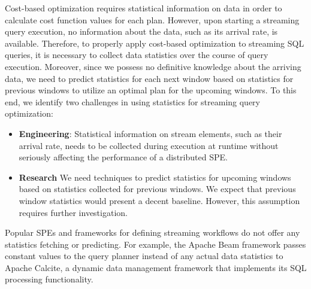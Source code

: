 Cost-based optimization requires statistical information on data in order to calculate cost function values for each plan. However, upon starting a streaming query execution, no information about the data, such as its arrival rate, is available. 
Therefore, to properly apply cost-based optimization to streaming SQL queries, it is necessary to collect data statistics over the course of query execution. 
Moreover, since we possess no definitive knowledge about the arriving data, we need to predict statistics for each next window based on statistics for previous windows to utilize an optimal plan for the upcoming windows. To this end, we identify two challenges in using statistics for streaming query optimization:

\begin{itemize}
    \item \textbf{Engineering}:
    Statistical information on stream elements, such as their arrival rate, needs to be collected during execution at runtime without seriously affecting the performance of a distributed SPE. %
    \item \textbf{Research}
We need techniques to predict statistics for upcoming windows based on statistics collected for previous windows.    
We expect that previous window statistics would present a decent baseline. 
However, this assumption requires further investigation. 
\end{itemize}

Popular SPEs and frameworks for defining streaming workflows do not offer any statistics fetching or predicting. 
For example, the Apache Beam framework passes constant values to the query planner instead of any actual data statistics to
 Apache Calcite, a dynamic data management framework that implements its SQL processing functionality.

